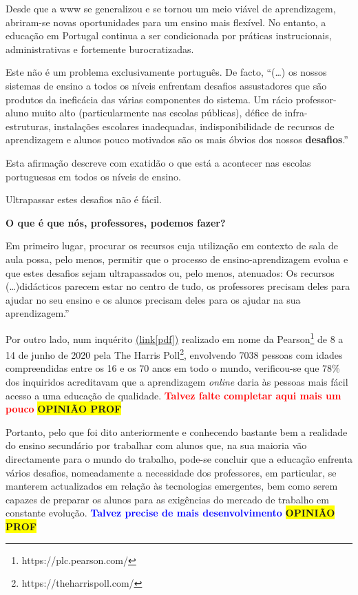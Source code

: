 Desde que a \acrfull{www} se generalizou e se tornou um meio viável de aprendizagem, abriram-se novas oportunidades para um ensino mais flexível. No entanto, a educação em Portugal continua a ser condicionada por práticas instrucionais, administrativas e fortemente burocratizadas.

Este não é um problema exclusivamente português. De facto, ``(\ldots) os nossos sistemas de ensino a todos os níveis enfrentam desafios assustadores que são produtos da ineficácia das várias componentes do sistema. Um rácio professor-aluno muito alto (particularmente nas escolas públicas), défice de infra-estruturas, instalações escolares inadequadas, indisponibilidade de recursos de aprendizagem e alunos pouco motivados são os mais óbvios dos nossos \textbf{desafios}\cite{virtuallabng}.''

Esta afirmação descreve com exatidão o que está a acontecer nas escolas portuguesas em todos os níveis de ensino.

Ultrapassar estes desafios não é fácil.

\textbf{O que é que nós, professores, podemos fazer?}

Em primeiro lugar, procurar os recursos cuja utilização em contexto de sala de aula possa, pelo menos, permitir que o processo de ensino-aprendizagem evolua e que estes desafios sejam ultrapassados ou, pelo menos, atenuados: Os recursos (\ldots)didácticos parecem estar no centro de tudo, os professores precisam deles para ajudar no seu ensino e os alunos precisam deles para os ajudar na sua aprendizagem\cite{virtuallabng}.''

Por outro lado, num inquérito \href{https://plc.pearson.com/sites/pearson-corp/files/footer-image/pearson-global-learners-survey-2020.pdf}{(link[pdf])} realizado em nome da Pearson\footnote{https://plc.pearson.com/} de 8 a 14 de junho de 2020 pela The Harris Poll\footnote{https://theharrispoll.com/}, envolvendo 7038 pessoas com idades compreendidas entre os 16 e os 70 anos em todo o mundo, verificou-se que 78\% dos inquiridos acreditavam que a aprendizagem \textit{online} daria às pessoas mais fácil acesso a uma educação de qualidade. \textbf{\textcolor{red}{Talvez falte completar aqui mais um pouco}} \colorbox{yellow}{\textbf{OPINIÃO PROF}}

Portanto, pelo que foi dito anteriormente e conhecendo bastante bem a realidade do ensino secundário por trabalhar com alunos que, na sua maioria vão directamente para o mundo do trabalho, pode-se concluir que a educação enfrenta vários desafios, nomeadamente a necessidade dos professores, em particular, se manterem actualizados em relação às tecnologias emergentes, bem como serem capazes de preparar os alunos para as exigências do mercado de trabalho em constante evolução.
\textcolor{blue}{\textbf{Talvez precise de mais desenvolvimento}} \colorbox{yellow}{\textbf{OPINIÃO PROF}}

